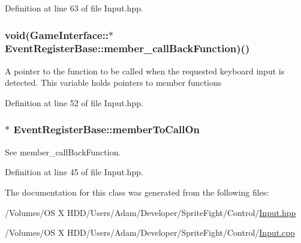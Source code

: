 Definition at line 63 of file Input.\-hpp.

\hypertarget{class_event_register_base_ad0d7c12c7c5c7176a48388cec7e74923}{
\subsubsection[{member\-\_\-call\-Back\-Function}]{\setlength{\rightskip}{0pt plus 5cm}void(Game\-Interface\-::$\ast$ Event\-Register\-Base\-::member\-\_\-call\-Back\-Function)()\hspace{0.3cm}{\ttfamily [protected]}}}\label{class_event_register_base_ad0d7c12c7c5c7176a48388cec7e74923}
A pointer to the function to be called when the requested keyboard input is detected. This variable holds pointers to member functions 

Definition at line 52 of file Input.\-hpp.

\hypertarget{class_event_register_base_a4747220b6d3bdaadda3adee1ad621d4e}{
\subsubsection[{member\-To\-Call\-On}]{$\ast$ Event\-Register\-Base\-::member\-To\-Call\-On\hspace{0.3cm}{\ttfamily [protected]}}}\label{class_event_register_base_a4747220b6d3bdaadda3adee1ad621d4e}
See member\-\_\-call\-Back\-Function. 

Definition at line 45 of file Input.\-hpp.



The documentation for this class was generated from the following files\-:\begin{DoxyCompactItemize}
\item 
/\-Volumes/\-O\-S X H\-D\-D/\-Users/\-Adam/\-Developer/\-Sprite\-Fight/\-Control/\hyperlink{_input_8hpp}{Input.\-hpp}\item 
/\-Volumes/\-O\-S X H\-D\-D/\-Users/\-Adam/\-Developer/\-Sprite\-Fight/\-Control/\hyperlink{_input_8cpp}{Input.\-cpp}\end{DoxyCompactItemize}
